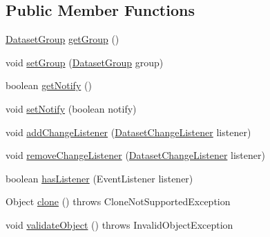 \subsection*{Public Member Functions}
\begin{DoxyCompactItemize}
\item 
\mbox{\hyperlink{classorg_1_1jfree_1_1data_1_1general_1_1_dataset_group}{Dataset\+Group}} \mbox{\hyperlink{classorg_1_1jfree_1_1data_1_1general_1_1_abstract_dataset_a8461feb0ca75008e174e5bf72a56f01d}{get\+Group}} ()
\item 
void \mbox{\hyperlink{classorg_1_1jfree_1_1data_1_1general_1_1_abstract_dataset_ab0442a73adac8fbb69594378b5e354b0}{set\+Group}} (\mbox{\hyperlink{classorg_1_1jfree_1_1data_1_1general_1_1_dataset_group}{Dataset\+Group}} group)
\item 
boolean \mbox{\hyperlink{classorg_1_1jfree_1_1data_1_1general_1_1_abstract_dataset_a8c3a906ab325e9e0c8a9041ce9f2d617}{get\+Notify}} ()
\item 
void \mbox{\hyperlink{classorg_1_1jfree_1_1data_1_1general_1_1_abstract_dataset_ac5e2c21ab014ad147f71fd914e81fbb8}{set\+Notify}} (boolean notify)
\item 
void \mbox{\hyperlink{classorg_1_1jfree_1_1data_1_1general_1_1_abstract_dataset_a98ccd0af41c59cd8fe50543376d0faf9}{add\+Change\+Listener}} (\mbox{\hyperlink{interfaceorg_1_1jfree_1_1data_1_1general_1_1_dataset_change_listener}{Dataset\+Change\+Listener}} listener)
\item 
void \mbox{\hyperlink{classorg_1_1jfree_1_1data_1_1general_1_1_abstract_dataset_ab0a2ba36de45585c70212701459b5979}{remove\+Change\+Listener}} (\mbox{\hyperlink{interfaceorg_1_1jfree_1_1data_1_1general_1_1_dataset_change_listener}{Dataset\+Change\+Listener}} listener)
\item 
boolean \mbox{\hyperlink{classorg_1_1jfree_1_1data_1_1general_1_1_abstract_dataset_a5e03b35046757be9ed9658322ab1872d}{has\+Listener}} (Event\+Listener listener)
\item 
Object \mbox{\hyperlink{classorg_1_1jfree_1_1data_1_1general_1_1_abstract_dataset_ac284644affaadfc85a8261665852e25b}{clone}} ()  throws Clone\+Not\+Supported\+Exception 
\item 
void \mbox{\hyperlink{classorg_1_1jfree_1_1data_1_1general_1_1_abstract_dataset_a7bd856ae173fdeedeb65c8f9cb461e52}{validate\+Object}} ()  throws Invalid\+Object\+Exception 
\end{DoxyCompactItemize}
